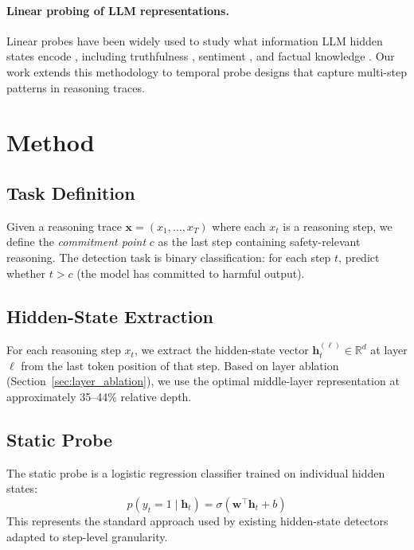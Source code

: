 \documentclass[11pt,a4paper]{article}
\begin{document}
\paragraph{Linear probing of LLM representations.}
Linear probes have been widely used to study what information LLM hidden states encode \cite{belinkov2022probing}, including truthfulness \cite{li2024inference}, sentiment \cite{tigges2023linear}, and factual knowledge \cite{meng2022locating}.
Our work extends this methodology to temporal probe designs that capture multi-step patterns in reasoning traces.

\section{Method}

\subsection{Task Definition}

Given a reasoning trace $\mathbf{x} = (x_1, \ldots, x_T)$ where each $x_t$ is a reasoning step, we define the \emph{commitment point} $c$ as the last step containing safety-relevant reasoning.
The detection task is binary classification: for each step $t$, predict whether $t > c$ (the model has committed to harmful output).

\subsection{Hidden-State Extraction}

For each reasoning step $x_t$, we extract the hidden-state vector $\mathbf{h}_t^{(\ell)} \in \mathbb{R}^d$ at layer $\ell$ from the last token position of that step.
Based on layer ablation (Section~\ref{sec:layer_ablation}), we use the optimal middle-layer representation at approximately 35--44\% relative depth.

\subsection{Static Probe}

The static probe is a logistic regression classifier trained on individual hidden states:
\begin{equation}
    p(y_t = 1 \mid \mathbf{h}_t) = \sigma(\mathbf{w}^\top \mathbf{h}_t + b)
\end{equation}
This represents the standard approach used by existing hidden-state detectors adapted to step-level granularity.
\end{document}
